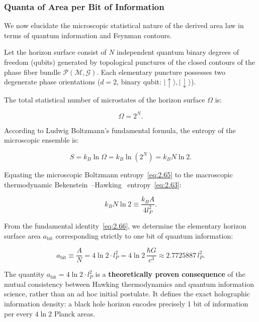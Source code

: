 \documentclass[11pt,a4paper]{article}
\theoremstyle{definition}
\begin{document}
\subsubsection{Quanta of Area per Bit of Information}\label{sec:2.6.2}

We now elucidate the microscopic statistical nature of the derived area law in terms of quantum information and Feynman contours.

Let the horizon surface consist of $N$ independent quantum binary degrees of freedom (qubits) generated by topological punctures of the closed contours of the phase fiber bundle $\mathcal{P}(\mathcal{M}, \mathcal{G})$. Each elementary puncture possesses two degenerate phase orientations ($d = 2$, binary qubit: $|\uparrow\rangle, |\downarrow\rangle$).

The total statistical number of microstates of the horizon surface $\Omega$ is:

\begin{equation}\label{eq:2.64}\tag{2.64}
\Omega = 2^N.
\end{equation}

According to Ludwig Boltzmann's fundamental formula, the entropy of the microscopic ensemble is:

\begin{equation}\label{eq:2.65}\tag{2.65}
S = k_B \ln\Omega = k_B \ln(2^N) = k_B N \ln 2.
\end{equation}

Equating the microscopic Boltzmann entropy~\eqref{eq:2.65} to the macroscopic thermodynamic Bekenstein~\cite{ref19}--Hawking~\cite{ref18} entropy~\eqref{eq:2.63}:

\begin{equation}\label{eq:2.66}\tag{2.66}
k_B N \ln 2 \equiv \frac{k_B A}{4 l_P^2}.
\end{equation}

From the fundamental identity~\eqref{eq:2.66}, we determine the elementary horizon surface area $a_{\text{bit}}$ corresponding strictly to one bit of quantum information:

\begin{equation}\label{eq:2.67}\tag{2.67}
a_{\text{bit}} \equiv \frac{A}{N} = 4\ln 2 \cdot l_P^2 = 4\ln 2 \, \frac{\hbar G}{c^3} \approx 2.7725887 \, l_P^2.
\end{equation}

The quantity $a_{\text{bit}} = 4\ln 2 \cdot l_P^2$ is a \textbf{theoretically proven consequence} of the mutual consistency between Hawking thermodynamics and quantum information science, rather than an ad hoc initial postulate. It defines the exact holographic information density: a black hole horizon encodes precisely 1 bit of information per every $4\ln 2$ Planck areas.
\end{document}
